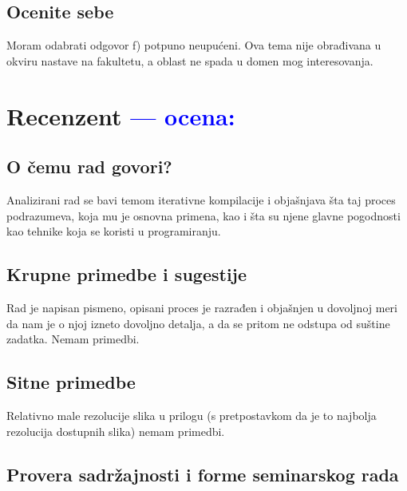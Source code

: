 \documentclass[a4paper]{report}
\newcommand{\odgovor}[1]{\textcolor{blue}{#1}}
\begin{document}
\section{Ocenite sebe}

Moram odabrati odgovor f) potpuno neupućeni. Ova tema nije obrađivana u okviru nastave na fakultetu, a oblast ne spada u domen mog interesovanja.


\chapter{Recenzent \odgovor{--- ocena:} }


\section{O čemu rad govori?}
Analizirani rad se bavi temom iterativne kompilacije i objašnjava šta taj proces podrazumeva, koja mu je osnovna primena, kao i šta su njene glavne pogodnosti kao tehnike koja se koristi u programiranju. 

\section{Krupne primedbe i sugestije}
Rad je napisan pismeno, opisani proces je razrađen i objašnjen u dovoljnoj meri da nam je o njoj izneto dovoljno detalja, a da se pritom ne odstupa od suštine zadatka. Nemam primedbi.

\section{Sitne primedbe}
Relativno male rezolucije slika u prilogu (s pretpostavkom da je to najbolja rezolucija dostupnih slika) nemam primedbi.

\section{Provera sadržajnosti i forme seminarskog rada}
\end{document}
